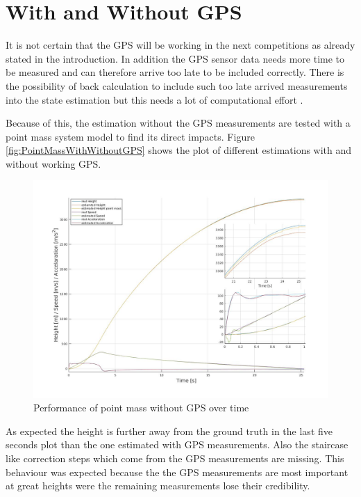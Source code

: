\section{With and Without GPS}
It is not certain that the GPS will be working in the next competitions as already stated in the introduction.
In addition the GPS sensor data needs more time to be measured and can therefore arrive too late to be included correctly.
There is the possibility of back calculation to include such too late arrived measurements into the state estimation but this needs a lot of computational effort \cite{SimonDan2006Ose:}.

Because of this, the estimation without the GPS measurements are tested with a point mass system model to find its direct impacts.
Figure \ref{fig:PointMassWithWithoutGPS} shows the plot of different estimations with and without working GPS.

\begin{figure}[h!]
 \centering
 \includegraphics[width=.8 \textwidth]{./Pictures/PointMassWihtoutGPSPerformance.jpg}
 \caption{Performance of point mass without GPS over time}
 \label{fig:PointMassWithoutGPSPerformance}
\end{figure}

As expected the height is further away from the ground truth in the last five seconds plot than the one estimated with GPS measurements.
Also the staircase like correction steps which come from the GPS measurements are missing.
This behaviour was expected because the the GPS measurements are most important at great heights were the remaining measurements lose their credibility.


